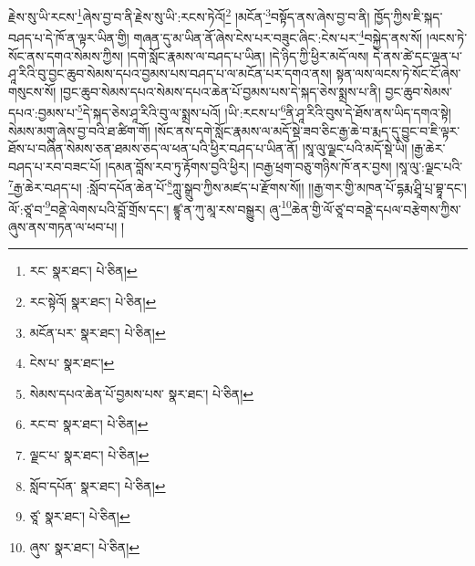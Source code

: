 རྗེས་སུ་ཡི་རངས་\footnote{རང་  སྣར་ཐང་།  པེ་ཅིན། }ཞེས་བྱ་བ་ནི་རྗེས་སུ་ཡི་:རངས་ཏེའོ།\footnote{རང་སྟེའོ།  སྣར་ཐང་།  པེ་ཅིན། } །མངོན་\footnote{མངོན་པར་  སྣར་ཐང་།  པེ་ཅིན། }བསྟོད་ནས་ཞེས་བྱ་བ་ནི། ཁྱོད་ཀྱིས་ཇི་སྐད་བཤད་པ་དེ་ཁོ་ན་ལྟར་ཡིན་གྱི། གཞན་དུ་མ་ཡིན་ནོ་ཞེས་ངེས་པར་བཟུང་ཞིང་:ངེས་པར་\footnote{ངེས་པ་  སྣར་ཐང་། }བསྐྱེད་ནས་སོ། །ལངས་ཏེ་སོང་ནས་དགའ་སེམས་ཀྱིས། །དགེ་སློང་རྣམས་ལ་བཤད་པ་ཡིན། །དེ་ཉིད་ཀྱི་ཕྱིར་མདོ་ལས། དེ་ནས་ཚེ་དང་ལྡན་པ་ཤཱ་རིའི་བུ་བྱང་ཆུབ་སེམས་དཔའ་བྱམས་པས་བཤད་པ་ལ་མངོན་པར་དགའ་ནས། སྟན་ལས་ལངས་ཏེ་སོང་ངོ་ཞེས་གསུངས་སོ། །བྱང་ཆུབ་སེམས་དཔའ་སེམས་དཔའ་ཆེན་པོ་བྱམས་པས་དེ་སྐད་ཅེས་སྨྲས་པ་ནི། བྱང་ཆུབ་སེམས་དཔའ་:བྱམས་པ་\footnote{སེམས་དཔའ་ཆེན་པོ་བྱམས་པས་  སྣར་ཐང་།  པེ་ཅིན། }དེ་སྐད་ཅེས་ཤཱ་རིའི་བུ་ལ་སྨྲས་པའོ། །ཡི་:རངས་པ་\footnote{རང་བ་  སྣར་ཐང་།  པེ་ཅིན། }ནི་ཤཱ་རིའི་བུས་དེ་ཐོས་ནས་ཡིད་དགའ་སྟེ། སེམས་མགུ་ཞེས་བྱ་བའི་ཐ་ཚིག་གོ། །སོང་ནས་དགེ་སློང་རྣམས་ལ་མདོ་སྡེ་ཟབ་ཅིང་རྒྱ་ཆེ་བ་རྨད་དུ་བྱུང་བ་ཇི་ལྟར་ཐོས་པ་བཞིན་སེམས་ཅན་ཐམས་ཅད་ལ་ཕན་པའི་ཕྱིར་བཤད་པ་ཡིན་ནོ། །སཱ་ལུ་ལྗང་པའི་མདོ་སྡེ་ཡི། །རྒྱ་ཆེར་བཤད་པ་རབ་བཟང་པོ། །དམན་བློས་རབ་ཏུ་རྟོགས་བྱའི་ཕྱིར། །བརྒྱ་ཕྲག་བཅུ་གཉིས་ཁོ་ནར་བྱས། །སཱ་ལུ་:ལྗང་པའི་\footnote{ལྗང་པ་  སྣར་ཐང་།  པེ་ཅིན། }རྒྱ་ཆེར་བཤད་པ། :སློབ་དཔོན་ཆེན་པོ་\footnote{སློབ་དཔོན་  སྣར་ཐང་།  པེ་ཅིན། }ཀླུ་སྒྲུབ་ཀྱིས་མཛད་པ་རྫོགས་སོ།། །།རྒྱ་གར་གྱི་མཁན་པོ་དྷརྨ་ཤྲཱི་པྲ་བྷཱ་དང་། ལོ་:ཙཱ་བ་\footnote{ཙཱ་  སྣར་ཐང་།  པེ་ཅིན། }བནྡེ་ལེགས་པའི་བློ་གྲོས་དང་། ཛྙཱ་ན་ཀུ་མཱ་རས་བསྒྱུར། ཞུ་\footnote{ཞུས་  སྣར་ཐང་།  པེ་ཅིན། }ཆེན་གྱི་ལོ་ཙཱ་བ་བནྡེ་དཔལ་བརྩེགས་ཀྱིས་ཞུས་ནས་གཏན་ལ་ཕབ་པ། ། 